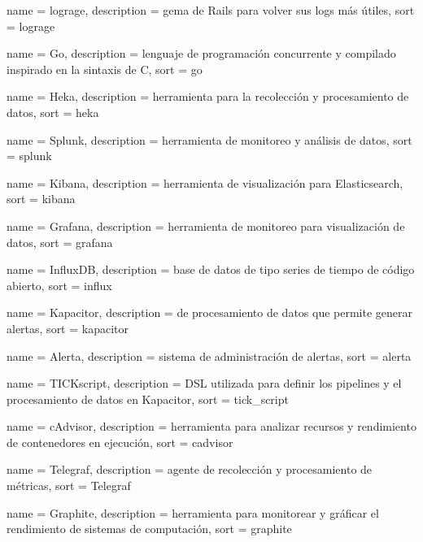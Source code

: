  {
  name        = {lograge},
  description = {gema de Rails para volver sus logs más útiles},
  sort        = {lograge}
}

 {
  name        = {Go},
  description =
    {lenguaje de programación concurrente y compilado inspirado en la sintaxis
    de C},
  sort        = {go}
}

 {
  name        = {Heka},
  description = {herramienta para la recolección y procesamiento de datos},
  sort        = {heka}
}

 {
  name        = {Splunk},
  description = {herramienta de monitoreo y análisis de datos},
  sort        = {splunk}
}

 {
  name        = {Kibana},
  description = {herramienta de visualización para Elasticsearch},
  sort        = {kibana}
}

 {
  name        = {Grafana},
  description = {herramienta de monitoreo para visualización de datos},
  sort        = {grafana}
}

 {
  name        = {InfluxDB},
  description = {base de datos de tipo series de tiempo de código abierto},
  sort        = {influx}
}

 {
  name        = {Kapacitor},
  description = { de procesamiento de datos que permite generar alertas},
  sort        = {kapacitor}
}

 {
  name        = {Alerta},
  description = {sistema de administración de alertas},
  sort        = {alerta}
}

 {
  name        = {TICKscript},
  description =
    {DSL utilizada para definir los pipelines y el procesamiento de datos en
    Kapacitor},
  sort        = {tick_script}
}

 {
  name        = {cAdvisor},
  description = {herramienta para analizar recursos y rendimiento de contenedores en ejecución},
  sort        = {cadvisor}
}

 {
  name        = {Telegraf},
  description = {agente de recolección y procesamiento de métricas},
  sort        = {Telegraf}
}

 {
  name        = {Graphite},
  description =
    {herramienta  para monitorear y gráficar el rendimiento de
    sistemas de computación},
  sort        = {graphite}
}

